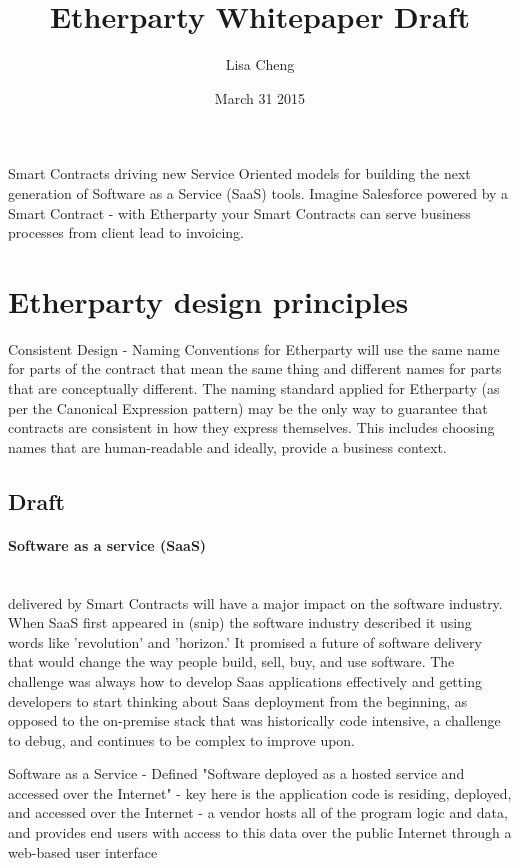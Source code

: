 \documentclass{article}
\title{Etherparty Whitepaper Draft }
\author{Lisa Cheng}
\date{March 31 2015}
\begin{document}
   \maketitle
Smart Contracts driving new Service Oriented models for building the next generation of Software as a Service (SaaS) tools. Imagine Salesforce powered by a Smart Contract - with Etherparty your Smart Contracts can serve business processes from client lead to invoicing.

\section{Etherparty design principles}
Consistent Design - Naming Conventions for Etherparty will use the same name for parts of the contract that mean the same thing and different names for parts that are conceptually different. The naming standard applied for Etherparty (as per the Canonical Expression pattern) may be the only way to guarantee that contracts are consistent in how they express themselves. This includes choosing names that are human-readable and ideally, provide a business context.

\subsection{Draft}
\paragraph{Software as a service (SaaS)} ~\\ delivered by Smart Contracts will have a major impact on the software industry. When SaaS first appeared in (snip) the software industry described it using words like 'revolution' and 'horizon.' It promised a future of software delivery that would change the way people build, sell, buy, and use software. The challenge was always how to develop Saas applications effectively and getting developers to start thinking about Saas deployment from the beginning, as opposed to the on-premise stack that was historically code intensive, a challenge to debug, and continues to be complex to improve upon.

Software as a Service - Defined
"Software deployed as a hosted service and accessed over the Internet"
- key here is the application code is residing, deployed, and accessed over the Internet
- a vendor hosts all of the program logic and data, and provides end users with access to this data over the public Internet through a web-based user interface
\end{document}
